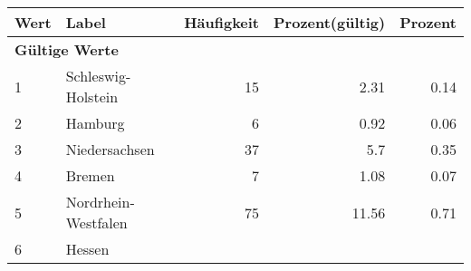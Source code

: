      \begin{longtable}{lXrrr}
     \toprule
     \textbf{Wert} & \textbf{Label} & \textbf{Häufigkeit} & \textbf{Prozent(gültig)} & \textbf{Prozent} \\
     \endhead
     \midrule
     \multicolumn{5}{l}{\textbf{Gültige Werte}}\\

     1 &
     \multicolumn{1}{X}{ Schleswig-Holstein   } &


       \num{15} &
       \num[round-mode=places,round-precision=2]{2.31} &
         \num[round-mode=places,round-precision=2]{0.14} \\

     2 &
     \multicolumn{1}{X}{ Hamburg   } &


       \num{6} &
       \num[round-mode=places,round-precision=2]{0.92} &
         \num[round-mode=places,round-precision=2]{0.06} \\

     3 &
     \multicolumn{1}{X}{ Niedersachsen   } &


       \num{37} &
       \num[round-mode=places,round-precision=2]{5.7} &
         \num[round-mode=places,round-precision=2]{0.35} \\

     4 &
     \multicolumn{1}{X}{ Bremen   } &


       \num{7} &
       \num[round-mode=places,round-precision=2]{1.08} &
         \num[round-mode=places,round-precision=2]{0.07} \\

     5 &
     \multicolumn{1}{X}{ Nordrhein-Westfalen   } &


       \num{75} &
       \num[round-mode=places,round-precision=2]{11.56} &
         \num[round-mode=places,round-precision=2]{0.71} \\

     6 &
     \multicolumn{1}{X}{ Hessen   } &



\end{longtable}
